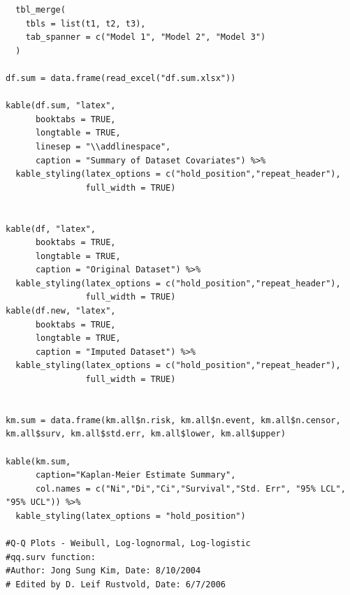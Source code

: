 \documentclass[
]{article}
\begin{document}
\begin{verbatim}
  tbl_merge(
    tbls = list(t1, t2, t3),
    tab_spanner = c("Model 1", "Model 2", "Model 3")
  )

df.sum = data.frame(read_excel("df.sum.xlsx"))

kable(df.sum, "latex", 
      booktabs = TRUE,
      longtable = TRUE,
      linesep = "\\addlinespace",
      caption = "Summary of Dataset Covariates") %>%
  kable_styling(latex_options = c("hold_position","repeat_header"),
                full_width = TRUE)


kable(df, "latex", 
      booktabs = TRUE,
      longtable = TRUE,
      caption = "Original Dataset") %>%
  kable_styling(latex_options = c("hold_position","repeat_header"),
                full_width = TRUE)
kable(df.new, "latex", 
      booktabs = TRUE,
      longtable = TRUE,
      caption = "Imputed Dataset") %>%
  kable_styling(latex_options = c("hold_position","repeat_header"),
                full_width = TRUE)


km.sum = data.frame(km.all$n.risk, km.all$n.event, km.all$n.censor, km.all$surv, km.all$std.err, km.all$lower, km.all$upper)

kable(km.sum, 
      caption="Kaplan-Meier Estimate Summary",
      col.names = c("Ni","Di","Ci","Survival","Std. Err", "95% LCL", "95% UCL")) %>%
  kable_styling(latex_options = "hold_position")

#Q-Q Plots - Weibull, Log-lognormal, Log-logistic
#qq.surv function: 
#Author: Jong Sung Kim, Date: 8/10/2004
# Edited by D. Leif Rustvold, Date: 6/7/2006


\end{verbatim}
\end{document}
